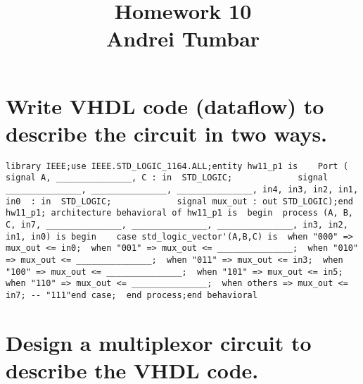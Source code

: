 \documentclass[twoside,11pt]{article}
\newcommand\assignmentNumber{10}
\newcommand\studentName{Andrei Tumbar}
\begin{document}
\title{\vspace{-3cm}Homework \assignmentNumber\\\studentName\vspace{-2cm}}
\maketitle
\vspace{-5cm}

\section{Write VHDL code (dataflow) to describe the circuit in two ways.}
\label{sec:background}


\begin{verbatim}
library IEEE;use IEEE.STD_LOGIC_1164.ALL;entity hw11_p1 is    Port ( signal A, _______________, C : in  STD_LOGIC;             signal _______________, _______________, _______________, in4, in3, in2, in1, in0  : in  STD_LOGIC;             signal mux_out : out STD_LOGIC);end hw11_p1; architecture behavioral of hw11_p1 is  begin  process (A, B, C, in7, _______________, _______________, _______________, in3, in2, in1, in0) is begin    case std_logic_vector'(A,B,C) is  when "000" => mux_out <= in0;  when "001" => mux_out <= _______________;  when "010" => mux_out <= _______________;  when "011" => mux_out <= in3;  when "100" => mux_out <= _______________;  when "101" => mux_out <= in5;  when "110" => mux_out <= _______________;  when others => mux_out <= in7; -- "111"end case;  end process;end behavioral

\end{verbatim}
\pagebreak

\section{Design a multiplexor circuit to describe the VHDL code.}

\begin{figure}[h!]
	\begin{center}
	\end{center}
\end{figure}
\end{document}
